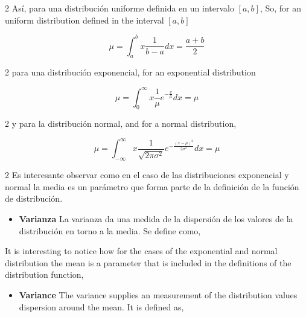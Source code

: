 \begin{paracol}{2}
Así, para una distribución uniforme definida en un intervalo $[a,b]$,
\switchcolumn
So, for an uniform distribution defined in the interval $[a,b]$
\end{paracol}
\begin{equation*}
\mu = \int_a^b x\frac{1}{b-a}dx = \frac{a+b}{2}
\end{equation*}
\begin{paracol}{2}
para una distribución exponencial,
\switchcolumn
for an exponential distribution
\end{paracol}
\begin{equation*}
\mu = \int_0^{\infty}x\frac{1}{\mu}e^{-\frac{x}{\mu}}dx = \mu
\end{equation*}
\begin{paracol}{2}
y para la distribución normal,
\switchcolumn
and for a normal distribution,
\end{paracol}

\begin{equation*}
\mu = \int_{-\infty}^{\infty}x \frac{1}{\sqrt{2\pi\sigma^2}}e^{-\frac{(x-\mu)^2}{2\sigma^2}}dx= \mu
\end{equation*}
\begin{paracol}{2}
Es interesante observar como en el caso de las distribuciones exponencial y normal la media es un parámetro que forma parte de la definición de la función de distribución.
\begin{itemize}
\item \textbf{Varianza} La varianza da una medida de la dispersión de los valores de 
la distribución en torno a la media. Se define como,
\end{itemize}
\switchcolumn
It is interesting to notice how for the cases of the exponential and normal distribution the mean is a parameter that is included in the definitions of the distribution function,
\begin{itemize}
	\item \textbf{Variance}  The variance supplies an measurement of the distribution values dispersion around the mean. It is defined as,
\end{itemize}
\end{paracol}


